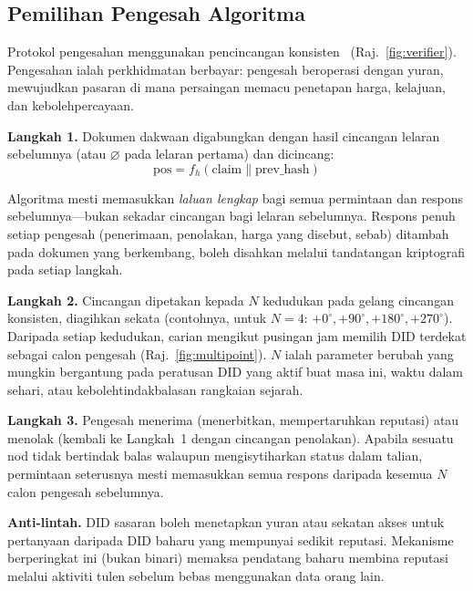\documentclass[11pt,a4paper,twocolumn]{article}
\begin{document}
\subsection{Pemilihan Pengesah Algoritma}

Protokol pengesahan menggunakan pencincangan konsisten~\cite{karger1997} (Raj.~\ref{fig:verifier}). Pengesahan ialah perkhidmatan berbayar: pengesah beroperasi dengan yuran, mewujudkan pasaran di mana persaingan memacu penetapan harga, kelajuan, dan kebolehpercayaan.

\textbf{Langkah 1.} Dokumen dakwaan digabungkan dengan hasil cincangan lelaran sebelumnya (atau $\varnothing$ pada lelaran pertama) dan dicincang:
\begin{equation}
\text{pos} = f_h(\text{claim} \| \text{prev\_hash})
\label{eq:hash}
\end{equation}

Algoritma mesti memasukkan \emph{laluan lengkap} bagi semua permintaan dan respons sebelumnya---bukan sekadar cincangan bagi lelaran sebelumnya. Respons penuh setiap pengesah (penerimaan, penolakan, harga yang disebut, sebab) ditambah pada dokumen yang berkembang, boleh disahkan melalui tandatangan kriptografi pada setiap langkah.

\textbf{Langkah 2.} Cincangan dipetakan kepada $N$ kedudukan pada gelang cincangan konsisten, diagihkan sekata (contohnya, untuk $N=4$: $+0^{\circ}, +90^{\circ}, +180^{\circ}, +270^{\circ}$). Daripada setiap kedudukan, carian mengikut pusingan jam memilih DID terdekat sebagai calon pengesah (Raj.~\ref{fig:multipoint}). $N$ ialah parameter berubah yang mungkin bergantung pada peratusan DID yang aktif buat masa ini, waktu dalam sehari, atau kebolehtindakbalasan rangkaian sejarah.

\textbf{Langkah 3.} Pengesah menerima (menerbitkan, mempertaruhkan reputasi) atau menolak (kembali ke Langkah~1 dengan cincangan penolakan). Apabila sesuatu nod tidak bertindak balas walaupun mengisytiharkan status dalam talian, permintaan seterusnya mesti memasukkan semua respons daripada kesemua $N$ calon pengesah sebelumnya.

\textbf{Anti-lintah.} DID sasaran boleh menetapkan yuran atau sekatan akses untuk pertanyaan daripada DID baharu yang mempunyai sedikit reputasi. Mekanisme berperingkat ini (bukan binari) memaksa pendatang baharu membina reputasi melalui aktiviti tulen sebelum bebas menggunakan data orang lain.
\end{document}
